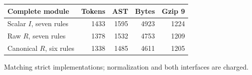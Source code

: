 \begin{center}
\small
\begin{tabular}{lrrrr}
\toprule
Complete module & Tokens & AST & Bytes & Gzip 9\\
\midrule
Scalar $I$, seven rules & 1433 & 1595 & 4923 & 1224\\
Raw $R$, seven rules & 1378 & 1532 & 4753 & 1209\\
Canonical $R$, six rules & 1338 & 1485 & 4611 & 1205\\
\bottomrule
\end{tabular}
\par\smallskip
Matching strict implementations; normalization and both interfaces are charged.
\end{center}
